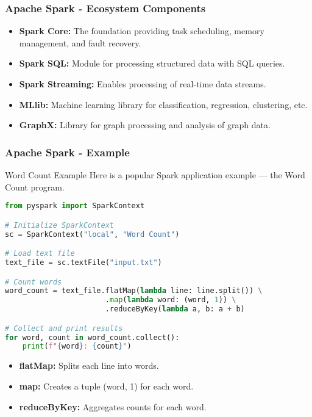 \documentclass[aspectratio=169]{beamer}
\begin{document}
\begin{frame}[fragile]
    \frametitle{Apache Spark - Ecosystem Components}
    \begin{itemize}
        \item \textbf{Spark Core:} The foundation providing task scheduling, memory management, and fault recovery.
        
        \item \textbf{Spark SQL:} Module for processing structured data with SQL queries.
        
        \item \textbf{Spark Streaming:} Enables processing of real-time data streams.
        
        \item \textbf{MLlib:} Machine learning library for classification, regression, clustering, etc.
        
        \item \textbf{GraphX:} Library for graph processing and analysis of graph data.
    \end{itemize}
\end{frame}

\begin{frame}[fragile]
    \frametitle{Apache Spark - Example}
    \begin{block}{Word Count Example}
        Here is a popular Spark application example — the Word Count program.
        
        \begin{lstlisting}[language=Python]
from pyspark import SparkContext

# Initialize SparkContext
sc = SparkContext("local", "Word Count")

# Load text file
text_file = sc.textFile("input.txt")

# Count words
word_count = text_file.flatMap(lambda line: line.split()) \
                       .map(lambda word: (word, 1)) \
                       .reduceByKey(lambda a, b: a + b)

# Collect and print results
for word, count in word_count.collect():
    print(f"{word}: {count}")
        \end{lstlisting}
    \end{block}
    
    \begin{itemize}
        \item \textbf{flatMap:} Splits each line into words.
        \item \textbf{map:} Creates a tuple (word, 1) for each word.
        \item \textbf{reduceByKey:} Aggregates counts for each word.
    \end{itemize}
\end{frame}
\end{document}
